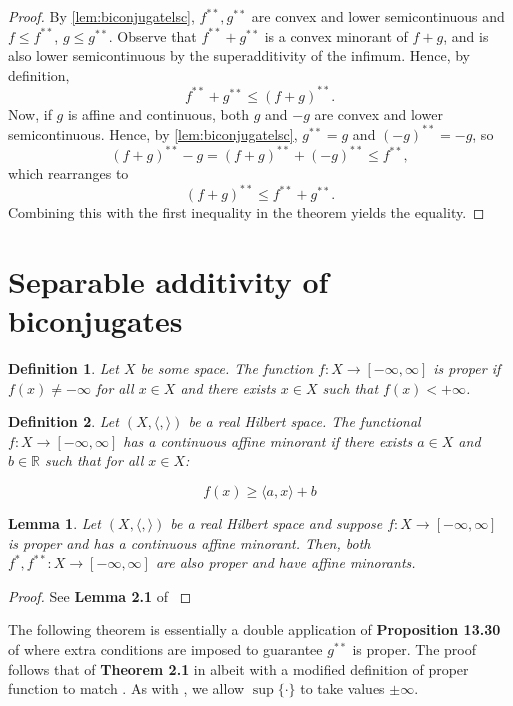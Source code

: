 \documentclass[11pt]{article}
\newtheorem{definition}{Definition}
\newtheorem{lemma}{Lemma}
\newcommand{\R}{\mathbb{R}}
\begin{document}
	\begin{proof}
		By \autoref{lem:biconjugatelsc}, $f^{**}, g^{**}$ are convex and lower semicontinuous and $f\leq f^{**}$, $g\leq g^{**}$. Observe that $f^{**} + g^{**}$ is a convex minorant of $f + g$, and is also lower semicontinuous by the superadditivity of the infimum. Hence, by definition, 
		\[	f^{**} + g^{**} \leq (f+g)^{**}.
				\]
		Now, if $g$ is affine and continuous, both $g$ and $-g$ are convex and lower semicontinuous. Hence, by \autoref{lem:biconjugatelsc}, $g^{**} = g$ and $(-g)^{**} = -g$, so
		\[	(f+g)^{**} - g = (f+g)^{**} + (-g)^{**}\leq f^{**},
				\]
		which rearranges to 
		\[	(f + g)^{**} \leq f^{**} + g^{**}.
				\]
		Combining this with the first inequality in the theorem yields the equality.
	\end{proof}
	
	\section{Separable additivity of biconjugates}
	
	\begin{definition}
		Let $X$ be some space. The function $f:X\to[-\infty, \infty]$ is proper if $f(x)\neq -\infty$ for all $x\in X$ and there exists $x\in X$ such that $f(x) < +\infty$.
		\end{definition}
	\begin{definition}
		Let $(X,\langle, \rangle)$ be a real Hilbert space. The functional $f:X\to[-\infty,\infty]$ has a continuous affine minorant if there exists $a\in X$ and $b\in\R$ such that for all $x\in X$:
		
		\[	f(x)\geq \langle a, x \rangle + b
				\]
		\end{definition}
	
	\begin{lemma}
		\label{lem:proper_affine}
		Let $(X,\langle, \rangle)$ be a real Hilbert space and suppose $f:X\to[-\infty, \infty]$ is proper and has a continuous affine minorant. Then, both $f^{*}, f^{**}:X\to[-\infty, \infty]$ are also proper and have affine minorants.
		\end{lemma}
	
		\begin{proof}
			See \textbf{Lemma 2.1} of \cite{Klein}
			\end{proof}
	
	\noindent The following theorem is essentially a double application of \textbf{Proposition 13.30} of \cite{Bauschke2010} where extra conditions are imposed to guarantee $g^{**}$ is proper. The proof follows that of \textbf{Theorem 2.1} in \cite{Klein} albeit with a modified definition of proper function to match \cite{Bauschke2010}. As with \cite{Bauschke2010}, we allow $\sup\{\cdot\}$ to take values $\pm\infty$. 
	
\end{document}
